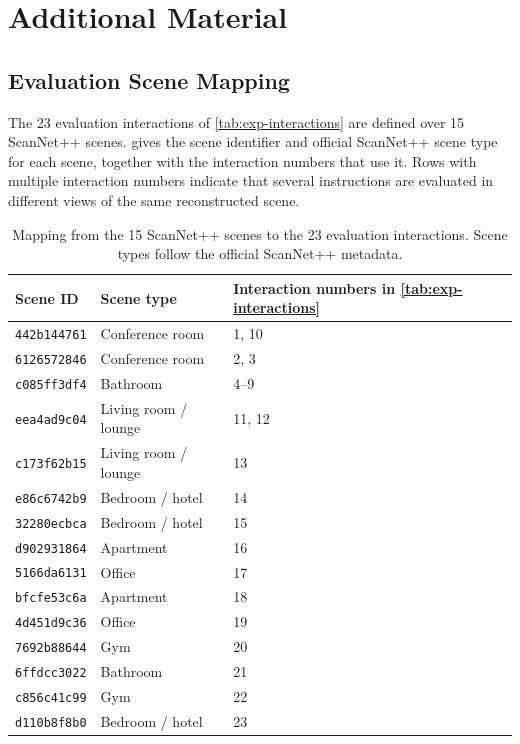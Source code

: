 \chapter{Additional Material}
\label{app:additional-material}
 
\section{Evaluation Scene Mapping}
\label{app:scene-mapping}
 
The 23 evaluation interactions of \cref{tab:exp-interactions} are defined over 15 ScanNet++ scenes.  gives the scene identifier and official ScanNet++ scene type for each scene, together with the interaction numbers that use it. Rows with multiple interaction numbers indicate that several instructions are evaluated in different views of the same reconstructed scene.
 
\begin{table}[htbp]
  \centering
  \caption[Evaluation scene mapping.]{Mapping from the 15 ScanNet++ scenes to the 23 evaluation interactions. Scene types follow the official ScanNet++ metadata.}
  \label{tab:scene-mapping}
  \small
  \begin{tabularx}{\textwidth}{@{}l l X@{}}
    \toprule
    Scene ID & Scene type & Interaction numbers in \cref{tab:exp-interactions} \\
    \midrule
    \texttt{442b144761} & Conference room & 1, 10 \\
    \texttt{6126572846} & Conference room & 2, 3 \\
    \texttt{c085ff3df4} & Bathroom & 4--9 \\
    \texttt{eea4ad9c04} & Living room / lounge & 11, 12 \\
    \texttt{c173f62b15} & Living room / lounge & 13 \\
    \texttt{e86c6742b9} & Bedroom / hotel & 14 \\
    \texttt{32280ecbca} & Bedroom / hotel & 15 \\
    \texttt{d902931864} & Apartment & 16 \\
    \texttt{5166da6131} & Office & 17 \\
    \texttt{bfcfe53c6a} & Apartment & 18 \\
    \texttt{4d451d9c36} & Office & 19 \\
    \texttt{7692b88644} & Gym & 20 \\
    \texttt{6ffdcc3022} & Bathroom & 21 \\
    \texttt{c856c41c99} & Gym & 22 \\
    \texttt{d110b8f8b0} & Bedroom / hotel & 23 \\
    \bottomrule
  \end{tabularx}
\end{table}
 
